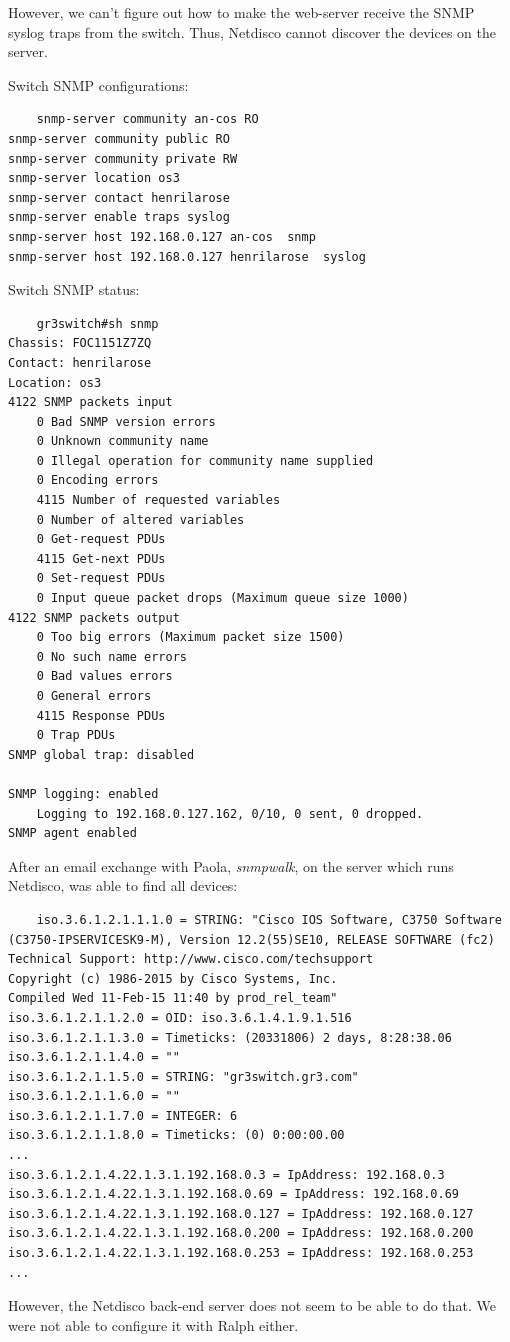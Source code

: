 \documentclass{article}
\begin{document}
However, we can't figure out how to make the web-server receive the SNMP syslog traps from the switch. Thus, Netdisco cannot discover the devices on the server.

Switch SNMP configurations:
\begin{verbatim}
    snmp-server community an-cos RO
snmp-server community public RO
snmp-server community private RW
snmp-server location os3
snmp-server contact henrilarose
snmp-server enable traps syslog
snmp-server host 192.168.0.127 an-cos  snmp
snmp-server host 192.168.0.127 henrilarose  syslog
\end{verbatim}

Switch SNMP status:
\begin{verbatim}
    gr3switch#sh snmp
Chassis: FOC1151Z7ZQ
Contact: henrilarose
Location: os3
4122 SNMP packets input
    0 Bad SNMP version errors
    0 Unknown community name
    0 Illegal operation for community name supplied
    0 Encoding errors
    4115 Number of requested variables
    0 Number of altered variables
    0 Get-request PDUs
    4115 Get-next PDUs
    0 Set-request PDUs
    0 Input queue packet drops (Maximum queue size 1000)
4122 SNMP packets output
    0 Too big errors (Maximum packet size 1500)
    0 No such name errors
    0 Bad values errors
    0 General errors
    4115 Response PDUs
    0 Trap PDUs
SNMP global trap: disabled

SNMP logging: enabled
    Logging to 192.168.0.127.162, 0/10, 0 sent, 0 dropped.
SNMP agent enabled
\end{verbatim}

After an email exchange with Paola, \textit{snmpwalk}, on the server which runs Netdisco, was able to find all devices:
\begin{verbatim}
    iso.3.6.1.2.1.1.1.0 = STRING: "Cisco IOS Software, C3750 Software (C3750-IPSERVICESK9-M), Version 12.2(55)SE10, RELEASE SOFTWARE (fc2)
Technical Support: http://www.cisco.com/techsupport
Copyright (c) 1986-2015 by Cisco Systems, Inc.
Compiled Wed 11-Feb-15 11:40 by prod_rel_team"
iso.3.6.1.2.1.1.2.0 = OID: iso.3.6.1.4.1.9.1.516
iso.3.6.1.2.1.1.3.0 = Timeticks: (20331806) 2 days, 8:28:38.06
iso.3.6.1.2.1.1.4.0 = ""
iso.3.6.1.2.1.1.5.0 = STRING: "gr3switch.gr3.com"
iso.3.6.1.2.1.1.6.0 = ""
iso.3.6.1.2.1.1.7.0 = INTEGER: 6
iso.3.6.1.2.1.1.8.0 = Timeticks: (0) 0:00:00.00
...
iso.3.6.1.2.1.4.22.1.3.1.192.168.0.3 = IpAddress: 192.168.0.3
iso.3.6.1.2.1.4.22.1.3.1.192.168.0.69 = IpAddress: 192.168.0.69
iso.3.6.1.2.1.4.22.1.3.1.192.168.0.127 = IpAddress: 192.168.0.127
iso.3.6.1.2.1.4.22.1.3.1.192.168.0.200 = IpAddress: 192.168.0.200
iso.3.6.1.2.1.4.22.1.3.1.192.168.0.253 = IpAddress: 192.168.0.253
...
\end{verbatim}

However, the Netdisco back-end server does not seem to be able to do that. We were not able to configure it with Ralph either.
\end{document}
